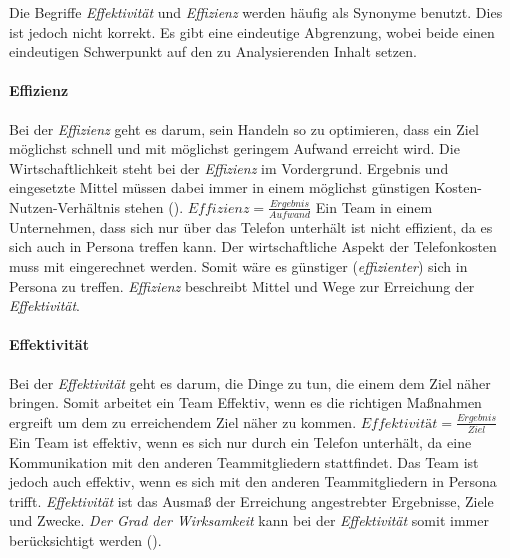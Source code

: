 \documentclass[a4paper,11pt]{article}%
\renewcommand{\\}{\vspace*{0.5\baselineskip} \newline}
\begin{document}
Die Begriffe \textit{Effektivität} und \textit{Effizienz} werden häufig als Synonyme benutzt. Dies ist jedoch nicht korrekt. Es gibt eine eindeutige Abgrenzung, wobei beide einen eindeutigen Schwerpunkt auf den zu Analysierenden Inhalt setzen.

\paragraph{Effizienz}
Bei der \textit{Effizienz} geht es darum, sein Handeln so zu optimieren, dass ein Ziel möglichst schnell und mit möglichst geringem Aufwand erreicht wird. Die Wirtschaftlichkeit steht bei der \textit{Effizienz} im Vordergrund. Ergebnis und eingesetzte Mittel müssen dabei immer in einem möglichst günstigen Kosten-Nutzen-Verhältnis stehen (\citep{eichhorn2005prinzip}).\\
$Effizienz = \frac{Ergebnis}{Aufwand}$\\
Ein Team in einem Unternehmen, dass sich nur über das Telefon unterhält ist nicht effizient, da es sich auch in Persona treffen kann.
Der wirtschaftliche Aspekt der Telefonkosten muss mit eingerechnet werden. Somit wäre es günstiger (\textit{effizienter}) sich in Persona zu treffen.
\textit{Effizienz} beschreibt Mittel und Wege zur Erreichung der \textit{Effektivität}.

\paragraph{Effektivität}
Bei der \textit{Effektivität} geht es darum, die Dinge zu tun, die einem dem Ziel näher bringen. 
Somit arbeitet ein Team Effektiv, wenn es die richtigen Maßnahmen ergreift um dem zu erreichendem Ziel näher zu kommen.\\
$Effektivität = \frac{Ergebnis}{Ziel}$ \\
Ein Team ist effektiv, wenn es sich nur durch ein Telefon unterhält, da eine Kommunikation mit den anderen Teammitgliedern stattfindet. Das Team ist jedoch auch effektiv, wenn es sich mit den anderen Teammitgliedern in Persona trifft.
\textit{Effektivität} ist das Ausmaß der Erreichung angestrebter Ergebnisse, Ziele und Zwecke.
\textit{Der Grad der Wirksamkeit} kann bei der \textit{Effektivität} somit immer berücksichtigt werden (\citep{eichhorn2005prinzip}).
\end{document}
